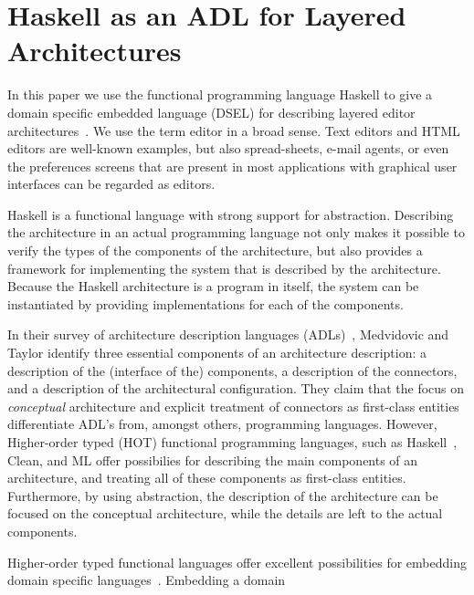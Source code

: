 

\chapter{Haskell as an ADL for Layered Architectures}
\label{chap:archCombs}

\par In this paper we use the functional programming
      language Haskell to give a domain specific embedded language (DSEL) for
      describing layered editor architectures~\cite{architecture}. We use the term
      editor in a broad sense. Text editors and HTML editors are well-known examples,
      but also spread-sheets, e-mail agents, or even the preferences screens that are
      present in most applications with graphical user interfaces can be regarded as
      editors.
\par  Haskell is a functional language with strong support for abstraction.
      Describing the architecture in an actual programming language not only makes it
      possible to verify the types of the components of the architecture, but also
      provides a framework for implementing the system that is described by the
      architecture. Because the Haskell architecture is a program in itself, the
      system can be instantiated by providing implementations for each of the
      components.
\par  In their survey of architecture description languages
      (ADLs)~\cite{medvidovicTaylor}, Medvidovic and Taylor identify
      three essential components of an architecture description: a description of the
      (interface of the) components, a description of the connectors, and a
      description of the architectural configuration. They claim that the focus on
      {\em conceptual} architecture and explicit treatment of connectors as
      first-class entities differentiate ADL's from, amongst others, programming
      languages. However, Higher-order typed (HOT) functional programming languages,
      such as Haskell~\cite{haskel}, Clean, and ML offer possibilies
      for describing the main components of an architecture, and treating all of
      these components as first-class entities. Furthermore, by using abstraction,
      the description of the architecture can be focused on the conceptual
      architecture, while the details are left to the actual components.
\par Higher-order typed functional languages offer excellent possibilities
      for embedding domain specific languages~\cite{hudak}. Embedding a domain
